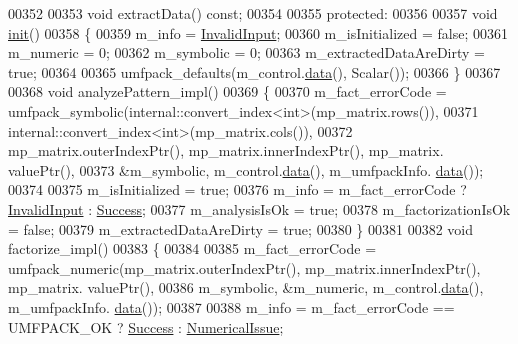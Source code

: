 \begin{DoxyCode}
00352 
00353     \textcolor{keywordtype}{void} extractData() \textcolor{keyword}{const};
00354 
00355   \textcolor{keyword}{protected}:
00356 
00357     \textcolor{keywordtype}{void} \hyperlink{structinit}{init}()
00358     \{
00359       m\_info                  = \hyperlink{group__enums_gga85fad7b87587764e5cf6b513a9e0ee5ea945604f62795ffc70aedf2bd12ea0434}{InvalidInput};
00360       m\_isInitialized         = \textcolor{keyword}{false};
00361       m\_numeric               = 0;
00362       m\_symbolic              = 0;
00363       m\_extractedDataAreDirty = \textcolor{keyword}{true};
00364 
00365       umfpack\_defaults(m\_control.\hyperlink{class_eigen_1_1_plain_object_base_ac25699535374b1854cf8494e44ad31b2}{data}(), Scalar());
00366     \}
00367 
00368     \textcolor{keywordtype}{void} analyzePattern\_impl()
00369     \{
00370       m\_fact\_errorCode = umfpack\_symbolic(internal::convert\_index<int>(mp\_matrix.rows()),
00371                                           internal::convert\_index<int>(mp\_matrix.cols()),
00372                                           mp\_matrix.outerIndexPtr(), mp\_matrix.innerIndexPtr(), mp\_matrix.
      valuePtr(),
00373                                           &m\_symbolic, m\_control.\hyperlink{class_eigen_1_1_plain_object_base_ac25699535374b1854cf8494e44ad31b2}{data}(), m\_umfpackInfo.
      \hyperlink{class_eigen_1_1_plain_object_base_ac25699535374b1854cf8494e44ad31b2}{data}());
00374 
00375       m\_isInitialized = \textcolor{keyword}{true};
00376       m\_info = m\_fact\_errorCode ? \hyperlink{group__enums_gga85fad7b87587764e5cf6b513a9e0ee5ea945604f62795ffc70aedf2bd12ea0434}{InvalidInput} : \hyperlink{group__enums_gga85fad7b87587764e5cf6b513a9e0ee5ea52581b035f4b59c203b8ff999ef5fcea}{Success};
00377       m\_analysisIsOk = \textcolor{keyword}{true};
00378       m\_factorizationIsOk = \textcolor{keyword}{false};
00379       m\_extractedDataAreDirty = \textcolor{keyword}{true};
00380     \}
00381 
00382     \textcolor{keywordtype}{void} factorize\_impl()
00383     \{
00384 
00385       m\_fact\_errorCode = umfpack\_numeric(mp\_matrix.outerIndexPtr(), mp\_matrix.innerIndexPtr(), mp\_matrix.
      valuePtr(),
00386                                          m\_symbolic, &m\_numeric, m\_control.\hyperlink{class_eigen_1_1_plain_object_base_ac25699535374b1854cf8494e44ad31b2}{data}(), m\_umfpackInfo.
      \hyperlink{class_eigen_1_1_plain_object_base_ac25699535374b1854cf8494e44ad31b2}{data}());
00387 
00388       m\_info = m\_fact\_errorCode == UMFPACK\_OK ? \hyperlink{group__enums_gga85fad7b87587764e5cf6b513a9e0ee5ea52581b035f4b59c203b8ff999ef5fcea}{Success} : \hyperlink{group__enums_gga85fad7b87587764e5cf6b513a9e0ee5eaaf9b736d310a664e7729d163a035cc5f}{NumericalIssue};

\end{DoxyCode}
